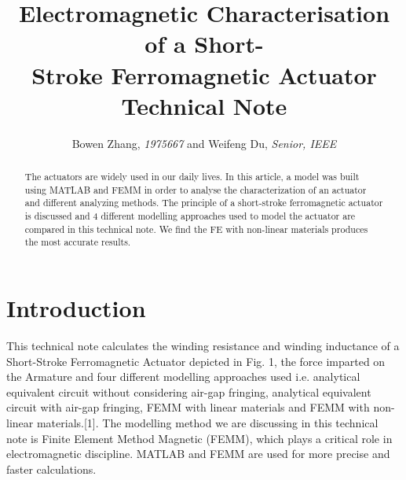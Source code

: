 \documentclass[a4paper]{IEEEtran}
\begin{document}
%
\title{Electromagnetic Characterisation of a Short-\\ Stroke Ferromagnetic Actuator Technical Note\vspace{-.1em}}

\author{Bowen Zhang, \textit{1975667}
	and Weifeng Du, \textit{Senior, IEEE}
\vspace{-.45em}
}

\maketitle

\thispagestyle{empty}
\begin{abstract}
The actuators are widely used in our daily lives. 
In this article, a model was built using MATLAB and FEMM in order to 
analyse the characterization of an actuator and different analyzing methods. 
The principle of a short-stroke ferromagnetic actuator is discussed 
and 4 different modelling approaches used to model the actuator are compared 
in this technical note. We find the FE with non-linear materials produces the most 
accurate results.
\end{abstract}

\vspace{1em}




%


\section{Introduction}
This technical note calculates the winding resistance and winding inductance 
of a Short-Stroke Ferromagnetic Actuator depicted in Fig. 1, 
the force imparted on the Armature and four different modelling 
approaches used i.e. analytical equivalent circuit without considering air-gap 
fringing, analytical equivalent circuit with air-gap fringing, 
FEMM with linear materials and FEMM with non-linear materials.[1]. 
The modelling method we are discussing in this technical note is Finite Element 
Method Magnetic (FEMM), which plays a critical role in electromagnetic discipline. 
MATLAB and FEMM are used for more precise and faster calculations.
\end{document}
